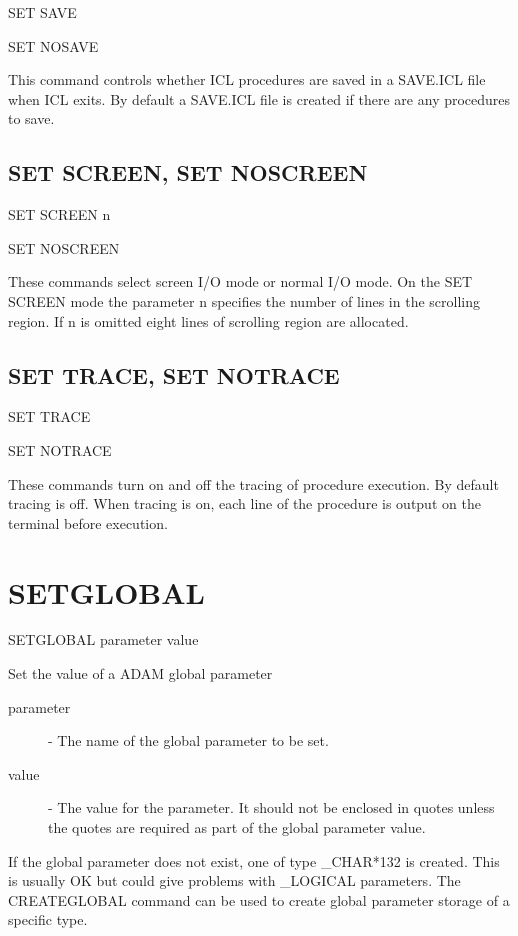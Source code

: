 \documentclass[twoside,11pt,nolof,chapters]{starlink}
\begin{document}
   SET SAVE

   SET NOSAVE

This command controls whether ICL procedures are saved in a SAVE.ICL file
when ICL exits. By default a SAVE.ICL file is created if there are any
procedures to save.

\subsection{SET SCREEN, SET NOSCREEN\label{SET_SCREEN}}

   SET SCREEN n

   SET NOSCREEN

These commands select screen I/O mode or normal I/O mode. On the SET SCREEN
mode the parameter n specifies the number of lines in the scrolling region.
If n is omitted eight lines of scrolling region are allocated.

\subsection{SET TRACE, SET NOTRACE\label{SET_TRACE}}

   SET TRACE

   SET NOTRACE

These commands turn on and off the tracing of procedure execution. By
default tracing is off. When tracing is on, each line of the procedure is
output on the terminal before execution.



\section{SETGLOBAL\label{SETGLOBAL}}

   SETGLOBAL \hspace{.5cm}  parameter \hspace{.5cm} value

Set the value of a ADAM global parameter

\begin{description}

\item[parameter] - The name of the global parameter to be set.

\item[value] - The value for the parameter. It should not be enclosed in quotes
unless the quotes are required as part of the global parameter value.

\end{description}
If the global parameter does not exist, one of type \_CHAR*132 is created.
This is usually OK but could give problems with \_LOGICAL parameters.
The CREATEGLOBAL command can be used to create global parameter storage of a
specific type.
\end{document}

